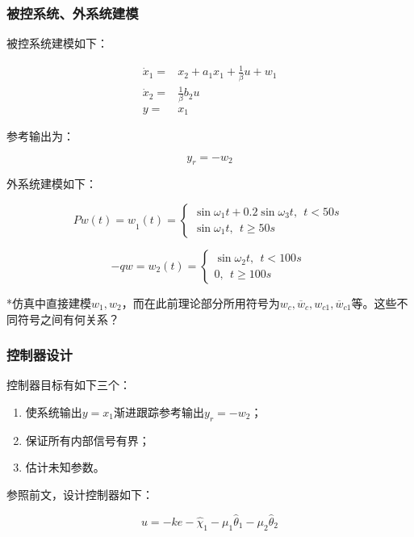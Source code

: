 \documentclass[
  12pt,
  a4paper
]{article}
\begin{document}
\subsubsection{被控系统、外系统建模}\label{ux88abux63a7ux7cfbux7edfux5916ux7cfbux7edfux5efaux6a21}

被控系统建模如下：

\[\begin{aligned}
{\dot{x}}_{1} = & x_{2} + a_{1}x_{1} + \frac{1}{\beta}u + w_{1} \\
{\dot{x}}_{2} = & \frac{1}{\beta}b_{2}u \\
y = & x_{1}
\end{aligned}\]

参考输出为：

\[y_{r} = - w_{2}\]

外系统建模如下：

\[P{w(t) = w}_{1}(t) = \left\{ \begin{array}{r}
\sin{\omega_{1}t} + 0.2\sin{\omega_{3}t},\ \ t < 50s \\
\sin{\omega_{1}t},\ \ t \geq 50s
\end{array} \right.\ \]

\[- qw = w_{2}(t) = \left\{ \begin{array}{r}
\sin{\omega_{2}t},\ \ t < 100s \\
0,\ \ t \geq 100s
\end{array} \right.\ \]

*仿真中直接建模\(w_{1},w_{2}\)，而在此前理论部分所用符号为\(w_{c},{\overline{w}}_{c},w_{c1},{\overline{w}}_{c1}\)等。这些不同符号之间有何关系？

\subsubsection{控制器设计}\label{ux63a7ux5236ux5668ux8bbeux8ba1}

控制器目标有如下三个：

\begin{enumerate}
\def\labelenumi{\arabic{enumi}.}
\item
  使系统输出\(y = x_{1}\)渐进跟踪参考输出\(y_{r} = - w_{2}\)；
\item
  保证所有内部信号有界；
\item
  估计未知参数。
\end{enumerate}

参照前文，设计控制器如下：

\[u = - ke - {\widehat{\chi}}_{1} - \mu_{1}{\widehat{\theta}}_{1} - \mu_{2}{\widehat{\theta}}_{2}\]
\end{document}
